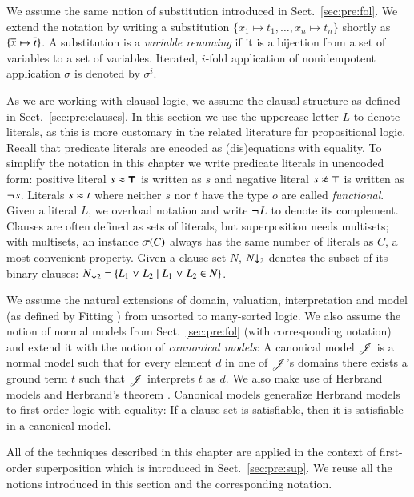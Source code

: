 We assume the same notion of substitution introduced in Sect.~\ref{sec:pre:fol}.
We extend the notation by writing a substitution $\{x_1 \mapsto t_1,
\ldots,\allowbreak x_n \mapsto t_n\}$ shortly as $\{ \overline{x}_{} \mapsto \overline{t}_{} \}$.
A substitution is a \emph{variable renaming} if it is a
bijection from a set of variables to a set of variables. Iterated, $i$-fold application 
of nonidempotent application $\sigma$ is denoted by $\sigma^i$.


As we are working with clausal logic, we assume the clausal structure as defined
in Sect.~\ref{sec:pre:clauses}. In this section we use the uppercase letter $L$
to denote literals, as this is more customary in the related literature for
propositional logic. Recall that predicate literals  are encoded as
(dis)equations with equality. To simplify the notation in this chapter we write
predicate literals in unencoded form: positive literal $s \approx \pmb{\top}$ is
written as $s$ and negative literal $\neqlit{s}{\top}$ is written as
$\neg{\kern.2ex s}$. Literals $s \approx t$ where neither $s$ nor $t$ have the
type $o$ are called \emph{functional}. Given a literal $L$, we overload notation
and write $\neg{\kern.2ex L}$ to denote its complement. Clauses are often defined as
sets of literals, but superposition needs multisets; with multisets, an instance
$\sigma(C)$ always has the same number of literals as $C$, a most convenient
property. Given a clause set $N$, $N{\downarrow}_2$ denotes the subset of its binary
clauses: $N{\downarrow}_2 = \{ L_1 \mathrel{\lor} L_2 \mid L_1 \mathrel{\lor} L_2 \in N \}$.

We assume the natural extensions of domain, valuation, interpretation and model
(as defined by Fitting \cite{mf-1996-fol}) from unsorted to many-sorted logic.
We also assume the notion of normal models from Sect.~\ref{sec:pre:fol} (with
corresponding notation) and extend it with the notion of \emph{cannonical
models}: A canonical model $\mathscr{J}$ is a normal model such that for every
element $d$ in one of $\mathscr{J}$'s domains there exists a ground term $t$ such
that $\mathscr{J}$ interprets $t$ as $d$. 
We also make use of Herbrand models and Herbrand's theorem \cite[Sect.~5.4]{mf-1996-fol}.
Canonical models generalize Herbrand
models to first-order logic with equality: If a clause set is satisfiable, then
it is satisfiable in a canonical model.

All of the techniques described in this chapter are applied in the context of
first-order superposition which is introduced in Sect.~\ref{sec:pre:sup}. We
reuse all the notions introduced in this section and the corresponding notation. 

